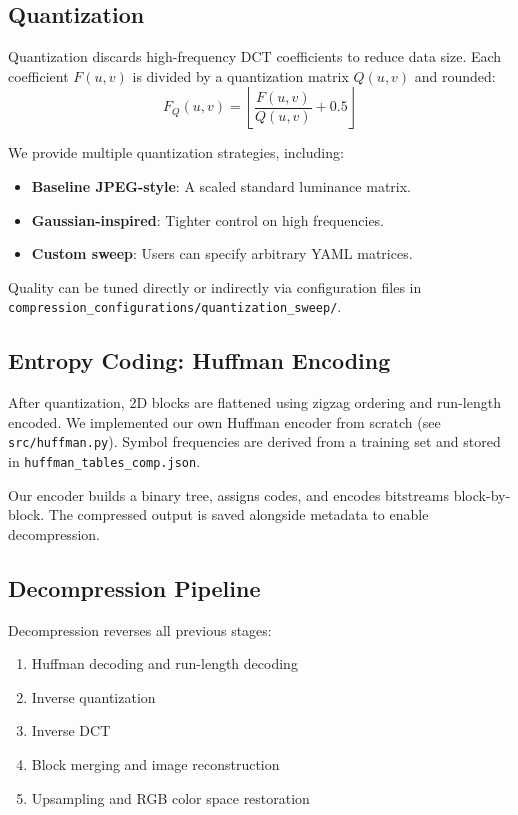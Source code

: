 \subsection{Quantization}

Quantization discards high-frequency DCT coefficients to reduce data size. Each coefficient $F(u,v)$ is divided by a quantization matrix $Q(u,v)$ and rounded:
\begin{equation}
F_Q(u,v) = \left\lfloor \frac{F(u,v)}{Q(u,v)} + 0.5 \right\rfloor
\end{equation}

We provide multiple quantization strategies, including:
\begin{itemize}
    \item \textbf{Baseline JPEG-style}: A scaled standard luminance matrix.
    \item \textbf{Gaussian-inspired}: Tighter control on high frequencies.
    \item \textbf{Custom sweep}: Users can specify arbitrary YAML matrices.
\end{itemize}

Quality can be tuned directly or indirectly via configuration files in \texttt{compression\_configurations/\allowbreak quantization\_sweep/}.

\subsection{Entropy Coding: Huffman Encoding}

After quantization, 2D blocks are flattened using zigzag ordering and run-length encoded. We implemented our own Huffman encoder from scratch (see \texttt{src/huffman.py}). Symbol frequencies are derived from a training set and stored in \texttt{huffman\_tables\_comp.json}.

Our encoder builds a binary tree, assigns codes, and encodes bitstreams block-by-block. The compressed output is saved alongside metadata to enable decompression.

\subsection{Decompression Pipeline}

Decompression reverses all previous stages:
\begin{enumerate}
    \item Huffman decoding and run-length decoding
    \item Inverse quantization
    \item Inverse DCT
    \item Block merging and image reconstruction
    \item Upsampling and RGB color space restoration
\end{enumerate}

